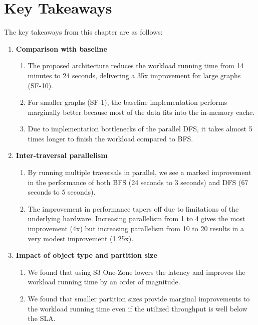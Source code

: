 \section{Key Takeaways}\label{sec:keyTakeaways}
The key takeaways from this chapter are as follows:
\begin{enumerate}
    \item \textbf{Comparison with baseline}
        \begin{enumerate}
            \item The proposed architecture reduces the workload running time from 14
                minutes to 24 seconds, delivering a 35x improvement for large graphs
                (SF-10). 
            \item For smaller graphs (SF-1), the baseline implementation performs
                marginally better because most of the data fits into the in-memory cache.
            \item Due to implementation bottlenecks of the parallel DFS, it takes almost
                5 times longer to finish the workload compared to BFS.
        \end{enumerate}
    \item \textbf{Inter-traversal parallelism}
        \begin{enumerate}
            \item By running multiple traversals in parallel, we see a marked
                improvement in the performance of both BFS (24 seconds to 3
                seconds) and DFS (67 seconds to 5 seconds).
            \item The improvement in performance tapers off due to limitations
                of the underlying hardware. Increasing parallelism from 1 to 4
                gives the most improvement (4x) but increasing parallelism from
                10 to 20 results in a very modest improvement (1.25x).
        \end{enumerate}
    \item \textbf{Impact of object type and partition size}
        \begin{enumerate}
            \item We found that using S3 One-Zone lowers the latency and
                improves the workload running time by an order of magnitude. 
            \item We found that smaller partition sizes provide marginal
                improvements to the workload running time even if the utilized
                throughput is well below the SLA.

\end{enumerate}
\end{enumerate}
